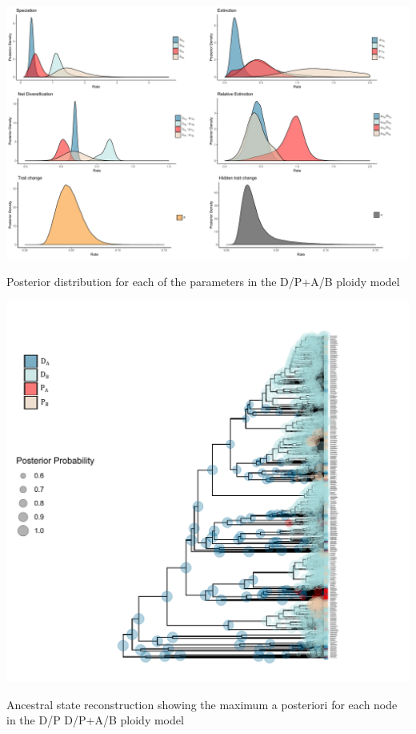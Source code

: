 \begin{suppfigure}
\includegraphics[width=\textwidth]{hisseDPnodipposteriordist.pdf}
\caption{Posterior distribution for each of the parameters in the D/P+A/B ploidy model} %
\label{suppfigure:DPnodipAB}
\end{suppfigure}

\begin{suppfigure}
\includegraphics[width=\textwidth]{asrDPAB.pdf}
\caption{Ancestral state reconstruction showing the maximum a posteriori for each node in the D/P D/P+A/B ploidy model} %
\label{suppfigure:DPnodipABasr}
\end{suppfigure}

